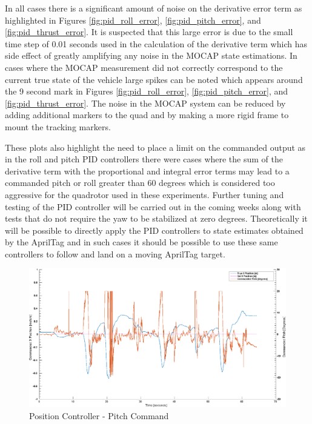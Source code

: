 \documentclass[11pt, twocolumn]{article}
\begin{document}
In all cases there is a significant amount of noise on the derivative error term as highlighted in Figures \ref{fig:pid_roll_error}, \ref{fig:pid_pitch_error}, and \ref{fig:pid_thrust_error}. It is suspected that this large error is due to the small time step of 0.01 seconds used in the calculation of the derivative term which has side effect of greatly amplifying any noise in the MOCAP state estimations. In cases where the MOCAP measurement did not correctly correspond to the current true state of the vehicle large spikes can be noted which appears around the 9 second mark in Figures \ref{fig:pid_roll_error}, \ref{fig:pid_pitch_error}, and \ref{fig:pid_thrust_error}. The noise in the MOCAP system can be reduced by adding additional markers to the quad and by making a more rigid frame to mount the tracking markers. 

These plots also highlight the need to place a limit on the commanded output as in the roll and pitch PID controllers there were cases where the sum of the derivative term with the proportional and integral error terms may lead to a commanded pitch or roll greater than 60 degrees which is considered too aggressive for the quadrotor used in these experiments. Further tuning and testing of the PID controller will be carried out in the coming weeks along with tests that do not require the yaw to be stabilized at zero degrees. Theoretically it will be possible to directly apply the PID controllers to state estimates obtained by the AprilTag and in such cases it should be possible to use these same controllers to follow and land on a moving AprilTag target. 


\begin{figure}
	\centering
	\includegraphics[width=\textwidth]{images/PID_Pitch_x_true_and_obs.eps}
	\caption{Position Controller - Pitch Command}
	\label{fig:pid_roll_command}
\end{figure}
\end{document}
